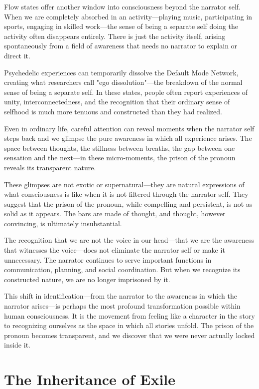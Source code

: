 Flow states offer another window into consciousness beyond the narrator self. When we are completely absorbed in an activity—playing music, participating in sports, engaging in skilled work—the sense of being a separate self doing the activity often disappears entirely. There is just the activity itself, arising spontaneously from a field of awareness that needs no narrator to explain or direct it.

Psychedelic experiences can temporarily dissolve the Default Mode Network, creating what researchers call "ego dissolution"—the breakdown of the normal sense of being a separate self. In these states, people often report experiences of unity, interconnectedness, and the recognition that their ordinary sense of selfhood is much more tenuous and constructed than they had realized.

Even in ordinary life, careful attention can reveal moments when the narrator self steps back and we glimpse the pure awareness in which all experience arises. The space between thoughts, the stillness between breaths, the gap between one sensation and the next—in these micro-moments, the prison of the pronoun reveals its transparent nature.

These glimpses are not exotic or supernatural—they are natural expressions of what consciousness is like when it is not filtered through the narrator self. They suggest that the prison of the pronoun, while compelling and persistent, is not as solid as it appears. The bars are made of thought, and thought, however convincing, is ultimately insubstantial.

The recognition that we are not the voice in our head—that we are the awareness that witnesses the voice—does not eliminate the narrator self or make it unnecessary. The narrator continues to serve important functions in communication, planning, and social coordination. But when we recognize its constructed nature, we are no longer imprisoned by it.

This shift in identification—from the narrator to the awareness in which the narrator arises—is perhaps the most profound transformation possible within human consciousness. It is the movement from feeling like a character in the story to recognizing ourselves as the space in which all stories unfold. The prison of the pronoun becomes transparent, and we discover that we were never actually locked inside it.

\section{The Inheritance of Exile}

